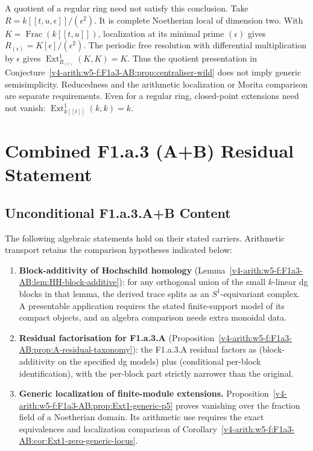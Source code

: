 \begin{example}
A quotient of a regular ring need not satisfy this conclusion.
Take \(R=k[[t,u,\epsilon]]/(\epsilon^2)\).
It is complete Noetherian local of dimension two. With
\(K=\operatorname{Frac}(k[[t,u]])\), localization at its minimal
prime \((\epsilon)\) gives \(R_{(\epsilon)}=K[\epsilon]/(\epsilon^2)\).
The periodic free resolution with differential multiplication by
\(\epsilon\) gives \(\operatorname{Ext}^1_{R_{(\epsilon)}}(K,K)=K\).
Thus the quotient presentation in
Conjecture~\ref{v4-arith:w5-f:F1a3-AB:prop:centraliser-wild}
does not imply generic semisimplicity. Reducedness and the arithmetic
localization or Morita comparison are separate requirements.
Even for a regular ring, closed-point extensions need not vanish:
\(\operatorname{Ext}^1_{k[[t]]}(k,k)=k\).
\end{example}

\section{Combined F1.a.3 (A+B) Residual Statement}
\label{v4-arith:w5-f:F1a3-AB:combined-AB}

\subsection{Unconditional F1.a.3.A+B Content}

\begin{theorem}
\label{v4-arith:w5-f:F1a3-AB:thm:unconditional-AB}
The following algebraic statements hold on their stated carriers.
Arithmetic transport retains the comparison hypotheses indicated below:
\begin{enumerate}
\item \textbf{Block-additivity of Hochschild homology}
(Lemma~\ref{v4-arith:w5-f:F1a3-AB:lem:HH-block-additive}): for any
orthogonal union of the small \(k\)-linear dg blocks in that lemma,
the derived trace splits as an \(S^1\)-equivariant complex. A
presentable application requires the stated finite-support model of
its compact objects, and an algebra comparison needs extra monoidal data.
\item \textbf{Residual factorisation for F1.a.3.A}
(Proposition~\ref{v4-arith:w5-f:F1a3-AB:prop:A-residual-taxonomy}): the
F1.a.3.A residual factors as (block-additivity on the specified dg models) plus
(conditional per-block identification), with the per-block part
strictly narrower than the original.
\item \textbf{Generic localization of finite-module extensions.}
Proposition~\ref{v4-arith:w5-f:F1a3-AB:prop:Ext1-generic-p5}
proves vanishing over the fraction field of a Noetherian domain.
Its arithmetic use requires the exact equivalences and localization
comparison of Corollary~\ref{v4-arith:w5-f:F1a3-AB:cor:Ext1-zero-generic-locus}.
\end{enumerate}
\end{theorem}

